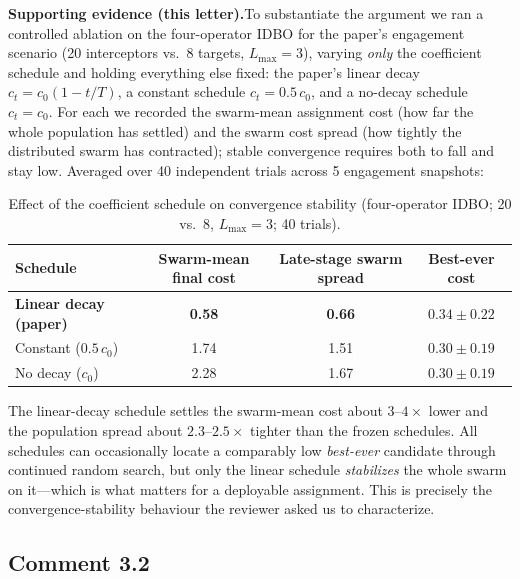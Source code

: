\documentclass[11pt]{article}
\newcommand{\evi}{\medskip\noindent\textbf{Supporting evidence (this letter).}\quad}
\begin{document}
\evi To substantiate the argument we ran a controlled ablation on the
four-operator IDBO for the paper's engagement scenario (20 interceptors vs.\ 8
targets, $L_{\max}=3$), varying \emph{only} the coefficient schedule and holding
everything else fixed: the paper's linear decay $c_t=c_0(1-t/T)$, a constant
schedule $c_t=0.5\,c_0$, and a no-decay schedule $c_t=c_0$. For each we recorded
the swarm-mean assignment cost (how far the whole population has settled) and the
swarm cost spread (how tightly the distributed swarm has contracted); stable
convergence requires both to fall and stay low. Averaged over 40 independent
trials across 5 engagement snapshots:

\begin{table}[h]
\centering
\captionsetup{font=small}
\caption*{\small Effect of the coefficient schedule on convergence stability
(four-operator IDBO; 20 vs.\ 8, $L_{\max}=3$; 40 trials).}
\begin{tabular}{lccc}
\toprule
Schedule & Swarm-mean final cost & Late-stage swarm spread & Best-ever cost \\
\midrule
\textbf{Linear decay (paper)} & \textbf{0.58} & \textbf{0.66} & $0.34\pm0.22$ \\
Constant ($0.5\,c_0$)         & 1.74          & 1.51          & $0.30\pm0.19$ \\
No decay ($c_0$)              & 2.28          & 1.67          & $0.30\pm0.19$ \\
\bottomrule
\end{tabular}
\end{table}

\noindent The linear-decay schedule settles the swarm-mean cost about
$3\text{--}4\times$ lower and the population spread about $2.3\text{--}2.5\times$
tighter than the frozen schedules. All schedules can occasionally locate a
comparably low \emph{best-ever} candidate through continued random search, but only
the linear schedule \emph{stabilizes} the whole swarm on it---which is what matters
for a deployable assignment. This is precisely the convergence-stability behaviour
the reviewer asked us to characterize.


\subsection*{Comment 3.2}
\end{document}
